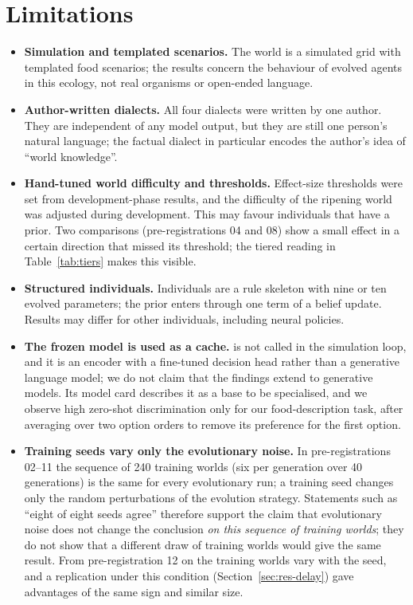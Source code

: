 \section{Limitations}
\label{sec:limitations}
\begin{itemize}
\item \textbf{Simulation and templated scenarios.} The world is a simulated grid with templated food scenarios; the results concern the behaviour of evolved agents in this ecology, not real organisms or open-ended language.
\item \textbf{Author-written dialects.} All four dialects were written by one author. They are independent of any model output, but they are still one person's natural language; the factual dialect in particular encodes the author's idea of ``world knowledge''.
\item \textbf{Hand-tuned world difficulty and thresholds.} Effect-size thresholds were set from development-phase results, and the difficulty of the ripening world was adjusted during development. This may favour individuals that have a prior. Two comparisons (pre-registrations 04 and 08) show a small effect in a certain direction that missed its threshold; the tiered reading in Table~\ref{tab:tiers} makes this visible.
\item \textbf{Structured individuals.} Individuals are a rule skeleton with nine or ten evolved parameters; the prior enters through one term of a belief update. Results may differ for other individuals, including neural policies.
\item \textbf{The frozen model is used as a cache.} \laya{} is not called in the simulation loop, and it is an encoder with a fine-tuned decision head rather than a generative language model; we do not claim that the findings extend to generative models. Its model card describes it as a base to be specialised, and we observe high zero-shot discrimination only for our food-description task, after averaging over two option orders to remove its preference for the first option.
\item \textbf{Training seeds vary only the evolutionary noise.} In pre-registrations 02--11 the sequence of 240 training worlds (six per generation over 40 generations) is the same for every evolutionary run; a training seed changes only the random perturbations of the evolution strategy. Statements such as ``eight of eight seeds agree'' therefore support the claim that evolutionary noise does not change the conclusion \emph{on this sequence of training worlds}; they do not show that a different draw of training worlds would give the same result. From pre-registration 12 on the training worlds vary with the seed, and a replication under this condition (Section~\ref{sec:res-delay}) gave advantages of the same sign and similar size.

\end{itemize}
